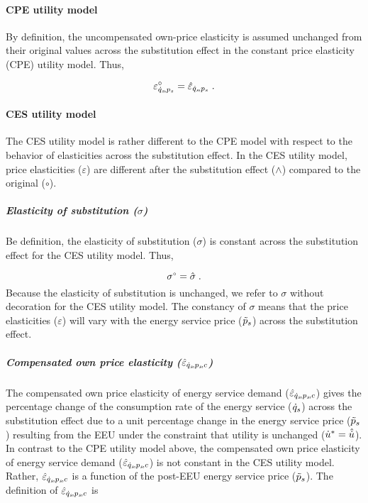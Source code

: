\documentclass[12pt]{article}\usepackage[]{graphicx}\usepackage[]{xcolor}
\begin{document}
\paragraph{CPE utility model} 

By definition, the uncompensated own-price
elasticity is assumed unchanged 
from their original values 
across the substitution effect
in the constant price elasticity (CPE) utility model. 
Thus, 

\begin{equation} \label{eq:cpe_hat_elasticities}
  \varepsilon^\circ_{\dot{q}_s\!,p_s} = \hat{\varepsilon}_{\dot{q}_s\!,p_s} \; .
\end{equation}


\paragraph{CES utility model} 

The CES utility model is rather different to the CPE model with respect to the 
behavior of elasticities across the substitution effect.
In the CES utility model, 
price elasticities ($\varepsilon$) are different 
after the substitution effect ($\wedge$) 
compared to the original ($\circ$).


\subparagraph{Elasticity of substitution ($\sigma$)} 

Be definition, the elasticity of substitution ($\sigma$)
is constant across the substitution effect for the CES utility model.
Thus,

\begin{equation}
  {}{\sigma}^{\scriptscriptstyle \circ} = \hat{\sigma} \; .
\end{equation}
%
Because the elasticity of substitution is unchanged, 
we refer to $\sigma$ without decoration for the CES utility model.
The constancy of $\sigma$ means that the price elasticities ($\varepsilon$)
will vary with the energy service price ($\tilde{p}_s$) 
across the substitution effect.


\subparagraph{Compensated own price elasticity ($\hat{\varepsilon}_{\dot{q}_s\!,p_s\!,c}$)} 

The compensated own price elasticity of energy service demand ($\hat{\varepsilon}_{\dot{q}_s\!,p_s\!,c}$)
gives the percentage change of the consumption rate of the energy service ($\dot{q}_s$)
across the substitution effect
due to a unit percentage change in the energy service price ($\tilde{p}_s$)
resulting from the EEU
under the constraint that utility is unchanged 
(${\dot{u}}^* = \hat{\dot{u}}$).
In contrast to the CPE utility model above, 
the compensated own price elasticity of energy service demand ($\hat{\varepsilon}_{\dot{q}_s\!,p_s\!,c}$)
is not constant in the CES utility model.
Rather, $\hat{\varepsilon}_{\dot{q}_s\!,p_s\!,c}$ is a function of the post-EEU energy service price ($\tilde{p}_s$).
The definition of $\hat{\varepsilon}_{\dot{q}_s\!,p_s\!,c}$ is 
\end{document}
